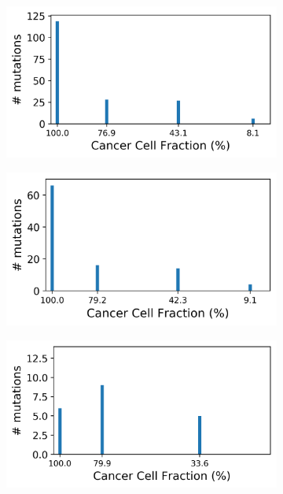 \documentclass{article}
\begin{document}
\begin{figure}[h]
	\centering
	\begin{subfigure}[t]{0.32\linewidth}
		\centering
		\includegraphics[width = 1.0\linewidth, trim={0 0 0 0}, clip=true]{ccube_analysis_noCN/cols.png}
	\end{subfigure}%
	\hspace{0.01 \linewidth}
	\begin{subfigure}[t]{0.32\linewidth}
		\centering
		\includegraphics[width = 1.0\linewidth, trim={0 0 0 0}, clip=true]{ccube_analysis_0CN_100/cols.png}
	\end{subfigure}%
	\hspace{0.01 \linewidth}
	\begin{subfigure}[t]{0.32\linewidth}
		\centering
		\includegraphics[width = 1.0\linewidth, trim={0 0 0 0}, clip=true]{ccube_analysis_0CN_20/cols.png}

\end{subfigure}
\end{figure}
\end{document}
